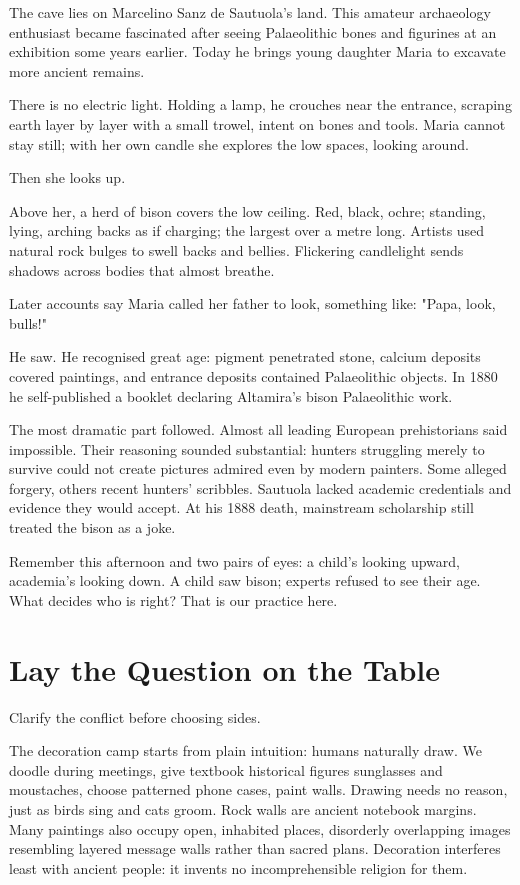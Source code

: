 The cave lies on Marcelino Sanz de Sautuola's land. This amateur archaeology enthusiast became fascinated after seeing Palaeolithic bones and figurines at an exhibition some years earlier. Today he brings young daughter Maria to excavate more ancient remains.

There is no electric light. Holding a lamp, he crouches near the entrance, scraping earth layer by layer with a small trowel, intent on bones and tools. Maria cannot stay still; with her own candle she explores the low spaces, looking around.

Then she looks up.

Above her, a herd of bison covers the low ceiling. Red, black, ochre; standing, lying, arching backs as if charging; the largest over a metre long. Artists used natural rock bulges to swell backs and bellies. Flickering candlelight sends shadows across bodies that almost breathe.

Later accounts say Maria called her father to look, something like: "Papa, look, bulls!"

He saw. He recognised great age: pigment penetrated stone, calcium deposits covered paintings, and entrance deposits contained Palaeolithic objects. In 1880 he self-published a booklet declaring Altamira's bison Palaeolithic work.

The most dramatic part followed. Almost all leading European prehistorians said impossible. Their reasoning sounded substantial: hunters struggling merely to survive could not create pictures admired even by modern painters. Some alleged forgery, others recent hunters' scribbles. Sautuola lacked academic credentials and evidence they would accept. At his 1888 death, mainstream scholarship still treated the bison as a joke.

Remember this afternoon and two pairs of eyes: a child's looking upward, academia's looking down. A child saw bison; experts refused to see their age. What decides who is right? That is our practice here.

\section{Lay the Question on the Table}
Clarify the conflict before choosing sides.

The decoration camp starts from plain intuition: humans naturally draw. We doodle during meetings, give textbook historical figures sunglasses and moustaches, choose patterned phone cases, paint walls. Drawing needs no reason, just as birds sing and cats groom. Rock walls are ancient notebook margins. Many paintings also occupy open, inhabited places, disorderly overlapping images resembling layered message walls rather than sacred plans. Decoration interferes least with ancient people: it invents no incomprehensible religion for them.


